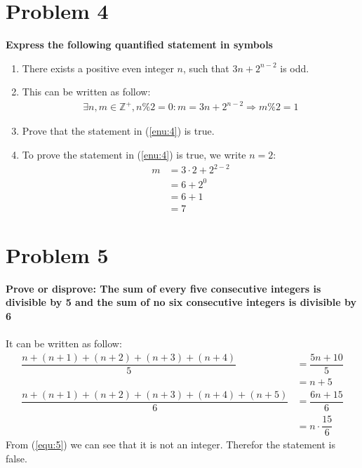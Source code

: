 \documentclass[english,11pt,a4paper]{article}
\begin{document}
\section*{Problem 4}
\textbf{Express the following quantified statement in symbols}
\begin{enumerate}[a]
\item \label{enu:4}There exists a positive even integer $n$, such that $3n+2^{n-2}$ is odd.
\item[] This can be written as follow:
\begin{align}
\exists n, m \in \mathbb{Z}^+, n\%2=0 : m= 3n+2^{n-2} \Rightarrow m\%2=1
\end{align}
\item Prove that the statement in (\ref{enu:4}) is true.
\item[] To prove the statement in (\ref{enu:4}) is true, we write $n=2$:
\begin{align}
m &= 3\cdot 2+2^{2-2}\\
	&=6+2^0\\
	&=6+1\\
	&=7
\end{align}
\end{enumerate}



\section*{Problem 5}
\textbf{Prove or disprove: The sum of every five consecutive integers is divisible by 5 and the sum of no six consecutive integers is divisible by 6}
\\
\\
It can be written as follow:
\begin{align}
\dfrac{n+(n+1)+(n+2)+(n+3)+(n+4)}{5} 
	&=\dfrac{5n+10}{5}\\
	&=n+5 \\
\dfrac{n+(n+1)+(n+2)+(n+3)+(n+4)+(n+5)}{6}
	&= \dfrac{6n+15}{6} \\
	&= n\cdot \dfrac{15}{6} \label{equ:5}
\end{align}
From (\ref{equ:5}) we can see that it is not an integer.
Therefor the statement is false.
\end{document}
